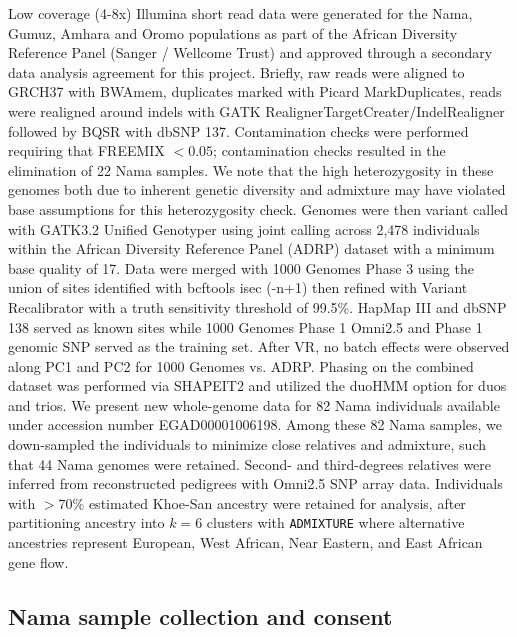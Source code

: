 \documentclass[]{article}
\begin{document}
Low coverage (4-8x) Illumina short read data were generated for the Nama,
Gumuz, Amhara and Oromo populations as part of the African Diversity Reference
Panel (Sanger / Wellcome Trust) \citep{Gurdasani2015-qy,Pagani2015-pz} and
approved through a secondary data analysis agreement for this project. Briefly,
raw reads were aligned to GRCH37 with BWAmem, duplicates
marked with Picard MarkDuplicates, reads were realigned around indels with GATK
RealignerTargetCreater/IndelRealigner followed by BQSR with dbSNP 137.
Contamination checks were performed requiring that FREEMIX $<0.05$;
contamination checks resulted in the elimination of 22 Nama samples. We note
that the high heterozygosity in these genomes both due to inherent genetic
diversity and admixture may have violated base assumptions for this
heterozygosity check. Genomes were then variant called with GATK3.2 Unified
Genotyper \citep{DePristo2011-up} using joint calling across 2,478 individuals within
the African Diversity Reference Panel (ADRP) dataset with a
minimum base quality of 17. Data were merged with 1000
Genomes Phase 3 \citep{1000_Genomes_Project_Consortium2015-zq} using the union
of sites identified with bcftools isec (-n+1) \citep{Danecek2021-kc} then refined
with Variant Recalibrator with a truth sensitivity threshold of 99.5\%. HapMap
III and dbSNP 138 served as known sites while 1000 Genomes Phase 1 Omni2.5 and
Phase 1 genomic SNP served as the training set. After VR, no batch effects were
observed along PC1 and PC2 for 1000 Genomes vs. ADRP. Phasing on the combined
dataset was performed via SHAPEIT2 \citep{Delaneau2013-aw} and utilized the duoHMM
option for duos and trios. We present new whole-genome data for 82 Nama individuals 
available under accession number EGAD00001006198.
Among these 82 Nama samples, we down-sampled the individuals to minimize
close relatives and admixture, such that 44 Nama genomes were retained.
Second- and third-degrees relatives were inferred from reconstructed
pedigrees with Omni2.5 SNP array data.
Individuals with $>70\%$ estimated Khoe-San ancestry were retained for
analysis, after partitioning ancestry into $k=6$ clusters with \texttt{ADMIXTURE}
\citep{Alexander2009-sw} where alternative ancestries represent European, West
African, Near Eastern, and East African gene flow. 

\subsection{Nama sample collection and consent}
\end{document}
